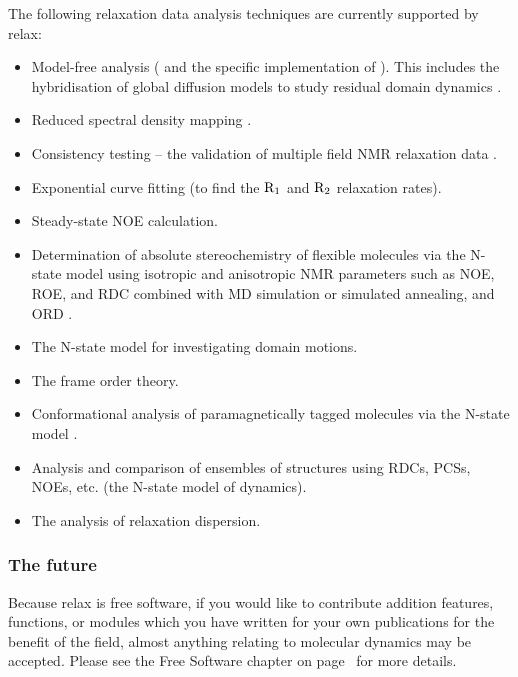 The following relaxation data analysis techniques are currently supported by relax:
\begin{itemize}
  \item Model-free analysis (\citet{LipariSzabo82a, LipariSzabo82b, Clore90a} and the specific implementation of \citet{dAuvergneGooley03,dAuvergneGooley06,dAuvergneGooley07,dAuvergneGooley08a,dAuvergneGooley08b}).
    This includes the hybridisation of global diffusion models to study residual domain dynamics \citep{Horne07}.
  \item Reduced spectral density mapping \citep{Farrow95, Lefevre96}.
  \item Consistency testing -- the validation of multiple field NMR relaxation data \citep{MorinGagne09a,Fushman99}.
  \item Exponential curve fitting (to find the $\mathrm{R}_1$ and $\mathrm{R}_2$ relaxation rates).
  \item Steady-state NOE calculation.
  \item Determination of absolute stereochemistry of flexible molecules via the N-state model using isotropic and anisotropic NMR parameters such as NOE, ROE, and RDC combined with MD simulation or simulated annealing, and ORD \citep{Sun11}.
  \item The N-state model for investigating domain motions.
  \item The frame order theory.
  \item Conformational analysis of paramagnetically tagged molecules via the N-state model \citep{Erdelyi11}.
  \item Analysis and comparison of ensembles of structures using RDCs, PCSs, NOEs, etc. (the N-state model of dynamics).
  \item The analysis of relaxation dispersion.
\end{itemize}


\subsubsection{The future}

Because relax is free software, if you would like to contribute addition features, functions, or modules which you have written for your own publications for the benefit of the field, almost anything relating to molecular dynamics may be accepted.
Please see the Free Software chapter on page~\pageref{ch: free software} for more details.



